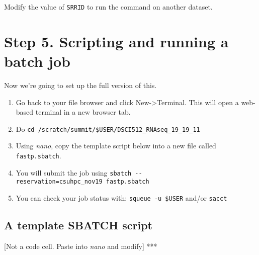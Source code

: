 \documentclass[11pt]{article}
\providecommand{\tightlist}{%
      \setlength{\itemsep}{0pt}\setlength{\parskip}{0pt}}
\newenvironment{Shaded}{}{}
\newcommand{\KeywordTok}[1]{\textcolor[rgb]{0.00,0.44,0.13}{\textbf{{#1}}}}
\newcommand{\StringTok}[1]{\textcolor[rgb]{0.25,0.44,0.63}{{#1}}}
\newcommand{\CommentTok}[1]{\textcolor[rgb]{0.38,0.63,0.69}{\textit{{#1}}}}
\newcommand{\NormalTok}[1]{{#1}}
\newcommand{\VariableTok}[1]{\textcolor[rgb]{0.10,0.09,0.49}{{#1}}}
\newcommand{\ExtensionTok}[1]{{#1}}
\begin{document}
    Modify the value of \texttt{SRRID} to run the command on another
dataset.

    \hypertarget{step-5.-scripting-and-running-a-batch-job}{%
\section{Step 5. Scripting and running a batch
job}\label{step-5.-scripting-and-running-a-batch-job}}

Now we're going to set up the full version of this.

\begin{enumerate}
\def\labelenumi{\arabic{enumi}.}
\tightlist
\item
  Go back to your file browser and click New-\textgreater Terminal. This
  will open a web-based terminal in a new browser tab.
\item
  Do \texttt{cd\ /scratch/summit/\$USER/DSCI512\_RNAseq\_19\_19\_11}
\item
  Using \emph{nano}, copy the template script below into a new file
  called \texttt{fastp.sbatch}.
\item
  You will submit the job using
  \texttt{sbatch\ -\/-reservation=csuhpc\_nov19\ fastp.sbatch}
\item
  You can check your job status with: \texttt{squeue\ -u\ \$USER} and/or
  \texttt{sacct}
\end{enumerate}

    \hypertarget{a-template-sbatch-script}{%
\subsection{A template SBATCH script}\label{a-template-sbatch-script}}

{[}Not a code cell. Paste into \emph{nano} and modify{]} ***

\begin{Shaded}
\end{Shaded}
\end{document}
